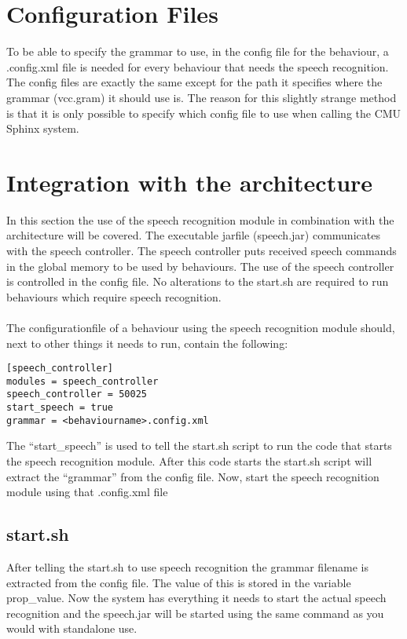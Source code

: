 \documentclass[a4paper, 10pt]{article}
\begin{document}
\section{Configuration Files}
To be able to specify the grammar to use, in the config file for the behaviour, a .config.xml file is needed for every behaviour that needs the speech recognition.\\
The config files are exactly the same except for the path it specifies where the grammar (vcc.gram) it should use is. 
The reason for this slightly strange method is that it is only possible to specify which config file to use when calling the CMU Sphinx system.

\newpage
\section{Integration with the architecture}

In this section the use of the speech recognition module in combination with the architecture will be covered. The executable jarfile (speech.jar) communicates with the speech controller. 
The speech controller puts received speech commands in the global memory to be used by behaviours.
The use of the speech controller is controlled in the config file. No alterations to the start.sh are required to run behaviours which require speech recognition.\\
\\
The configurationfile of a behaviour using the speech recognition module should, next to other things it needs to run, contain the following:

\begin{verbatim}
[speech_controller]
modules = speech_controller
speech_controller = 50025
start_speech = true
grammar = <behaviourname>.config.xml
\end{verbatim}
The ``start\_speech'' is used to tell the start.sh script to run the code that starts the speech recognition module. 
After this code starts the start.sh script will extract the ``grammar'' from the config file. Now,  start the speech recognition module using that .config.xml file

\subsection{start.sh}
After telling the start.sh to use speech recognition the grammar filename is extracted from the config file. The value of this is stored in the variable prop\_value.
Now the system has everything it needs to start the actual speech recognition and the speech.jar will be started using the same command as you would with standalone use.
 
\end{document}
